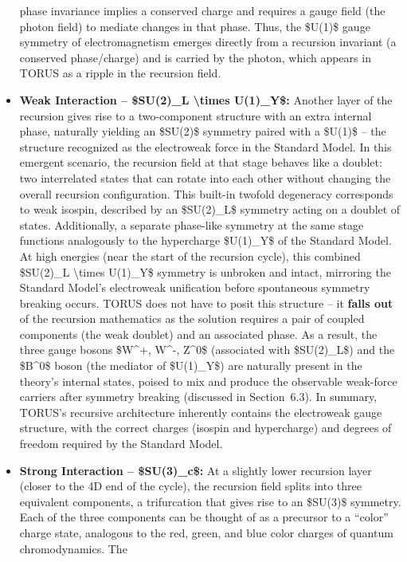 \begin{itemize}
  phase invariance implies a conserved charge and requires a gauge field
  (the photon field) to mediate changes in that phase​. Thus, the
  \$U(1)\$ gauge symmetry of electromagnetism emerges directly from a
  recursion invariant (a conserved phase/charge) and is carried by the
  photon, which appears in TORUS as a ripple in the recursion field.
\item
  \textbf{Weak Interaction -- \$SU(2)\_L \textbackslash{}times
  U(1)\_Y\$:} Another layer of the recursion gives rise to a
  two-component structure with an extra internal phase, naturally
  yielding an \$SU(2)\$ symmetry paired with a \$U(1)\$ -- the structure
  recognized as the electroweak force in the Standard Model. In this
  emergent scenario, the recursion field at that stage behaves like a
  doublet: two interrelated states that can rotate into each other
  without changing the overall recursion configuration. This built-in
  twofold degeneracy corresponds to weak isospin, described by an
  \$SU(2)\_L\$ symmetry acting on a doublet of states​. Additionally, a
  separate phase-like symmetry at the same stage functions analogously
  to the hypercharge \$U(1)\_Y\$ of the Standard Model. At high energies
  (near the start of the recursion cycle), this combined \$SU(2)\_L
  \textbackslash{}times U(1)\_Y\$ symmetry is unbroken and intact,
  mirroring the Standard Model's electroweak unification before
  spontaneous symmetry breaking occurs. TORUS does not have to posit
  this structure -- it \textbf{falls out} of the recursion mathematics
  as the solution requires a pair of coupled components (the weak
  doublet) and an associated phase. As a result, the three gauge bosons
  \$W\^{}+, W\^{}-, Z\^{}0\$ (associated with \$SU(2)\_L\$) and the
  \$B\^{}0\$ boson (the mediator of \$U(1)\_Y\$) are naturally present
  in the theory's internal states, poised to mix and produce the
  observable weak-force carriers after symmetry breaking (discussed in
  Section~6.3). In summary, TORUS's recursive architecture inherently
  contains the electroweak gauge structure, with the correct charges
  (isospin and hypercharge) and degrees of freedom required by the
  Standard Model.
\item
  \textbf{Strong Interaction -- \$SU(3)\_c\$:} At a slightly lower
  recursion layer (closer to the 4D end of the cycle), the recursion
  field splits into three equivalent components, a trifurcation that
  gives rise to an \$SU(3)\$ symmetry​. Each of the three components can
  be thought of as a precursor to a ``color'' charge state, analogous to
  the red, green, and blue color charges of quantum chromodynamics. The

\end{itemize}
